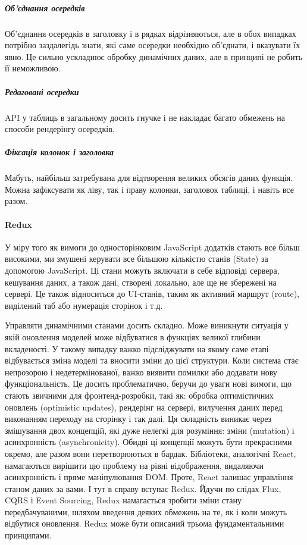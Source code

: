 \subparagraph{Об'єднання осередків}
Об'єднання осередків в заголовку і в рядках відрізняються, але в обох випадках потрібно заздалегідь знати, які саме осередки необхідно об'єднати, і вказувати їх явно. Це сильно ускладнює обробку динамічних даних, але в принципі не робить її неможливою.

\subparagraph{Редаговані осередки}
API у таблиць в загальному досить гнучке і не накладає багато обмежень на способи рендерінгу осередків. 

\subparagraph{Фіксація колонок і заголовка}
Мабуть, найбільш затребувана для відтворення великих обсягів даних функція. Можна зафіксувати як ліву, так і праву колонки, заголовок таблиці, і навіть все разом.

\paragraph{Redux}

У міру того як вимоги до односторінковим JavaScript додатків стають все більш високими, ми змушені керувати все більшою кількістю станів (State) за допомогою JavaScript. Ці стани можуть включати в себе відповіді сервера, кешування даних, а також дані, створені локально, але ще не збережені на сервері. Це також відноситься до UI-станів, таким як активний маршрут (route), виділений таб або нумерація сторінок і т.д.

Управляти динамічними станами досить складно. Може виникнути ситуація у якій оновлення моделей може відбуватися в функціях великої глибини вкладеності. У такому випадку важко підсліджувати на якому саме етапі відбувається зміна моделі та вносити зміни до цієї структури. Коли система стає непрозорою і недетермінованої, важко виявити помилки або додавати нову функціональність.
Це досить проблематично, беручи до уваги нові вимоги, що стають звичними для фронтенд-розробки, такі як: обробка оптимістичних оновлень (optimistic updates), рендерінг на сервері, вилучення даних перед виконанням переходу на сторінку і так далі.  Ця складність виникає через змішування двох концепцій, які дуже нелегкі для розуміння: зміни (mutation) і асинхронність (asynchronicity). Обидві ці концепції можуть бути прекрасними окремо, але разом вони перетворюються в бардак. Бібліотеки, аналогічні React, намагаються вирішити цю проблему на рівні відображення, видаляючи асинхронність і пряме маніпулювання DOM. Проте, React залишає управління станом даних за вами. І тут в справу вступає Redux.
Йдучи по слідах Flux, CQRS і Event Sourcing, Redux намагається зробити зміни стану передбачуваними, шляхом введення деяких обмежень на те, як і коли можуть відбутися оновлення. Redux може бути описаний трьома фундаментальними принципами.

